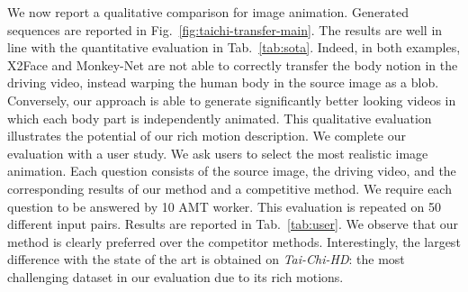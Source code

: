 \documentclass{article}
\begin{document}
 \begin{table}[t]
    \centering
    \caption{Video reconstruction: comparison with the state of the art on four different datasets.}
    \label{tab:sota}
 \end{table}
We now report a qualitative comparison for image animation. Generated sequences are reported in Fig.~\ref{fig:taichi-transfer-main}. The results are well in line with the quantitative evaluation in Tab.~\ref{tab:sota}. Indeed, in both examples, X2Face and Monkey-Net are not able to correctly transfer the body notion in the driving video, instead warping the human body in the source image as a blob. Conversely, our approach is able to generate significantly better looking videos in which each body part is independently animated. This qualitative evaluation illustrates the potential of our rich motion description. 
We complete our evaluation with a user study. We ask users to select the most realistic image animation. Each question consists of the source image, the driving video, and the corresponding results of our method and a competitive method. We require each question to be answered by 10 AMT worker. This evaluation is repeated on 50 different input pairs. Results are reported in Tab.~\ref{tab:user}. We observe that our method is clearly preferred over the competitor methods. Interestingly, the largest difference with the state of the art is obtained on \emph{Tai-Chi-HD}: the most challenging dataset in our evaluation due to its rich motions.
\end{document}
